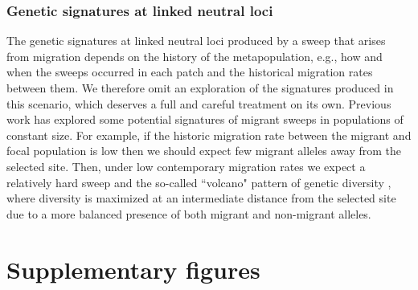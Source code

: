 \documentclass[]{article}
\begin{document}
\subsubsection*{Genetic signatures at linked neutral loci}

The genetic signatures at linked neutral loci produced by a sweep that arises from migration depends on the history of the metapopulation, e.g., how and when the sweeps occurred in each patch and the historical migration rates between them.
We therefore omit an exploration of the signatures produced in this scenario, which deserves a full and careful treatment on its own.
Previous work has explored some potential signatures of migrant sweeps in populations of constant size.
For example, if the historic migration rate between the migrant and focal population is low then we should expect few migrant alleles away from the selected site.
Then, under low contemporary migration rates we expect a relatively hard sweep and the so-called ``volcano" pattern of genetic diversity \citep{setter2019volcanofinder}, where diversity is maximized at an intermediate distance from the selected site due to a more balanced presence of both migrant and non-migrant alleles.

\newpage
\section*{Supplementary figures}
\end{document}
